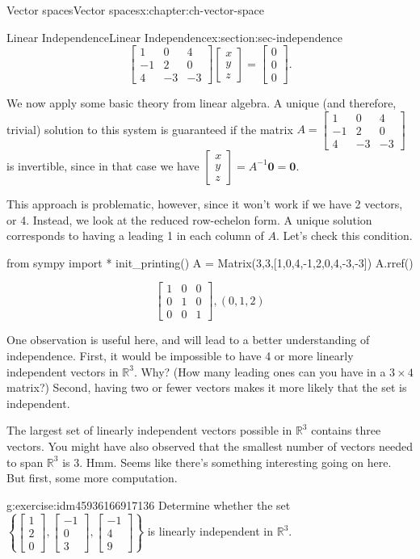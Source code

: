 \documentclass[oneside,10pt,]{book}
\numberwithin{equation}{section}
\newcommand{\bbm}{\begin{bmatrix}}
\newcommand{\ebm}{\end{bmatrix}}
\newcommand{\R}{\mathbb{R}}
\newcommand{\amp}{&}
\begin{document}
\begin{chapterptx}{Vector spaces}{}{Vector spaces}{}{}{x:chapter:ch-vector-space}
\begin{sectionptx}{Linear Independence}{}{Linear Independence}{}{}{x:section:sec-independence}
\begin{equation*}
\bbm 1\amp0\amp4\\-1\amp2\amp0\\4\amp-3\amp-3\ebm\bbm x\\y\\z\ebm = \bbm 0\\0\\0\ebm\text{.}
\end{equation*}
%
\par
We now apply some basic theory from linear algebra. A unique (and therefore, trivial) solution to this system is guaranteed if the matrix \(A = \bbm 1\amp0\amp4\\-1\amp2\amp0\\4\amp-3\amp-3\ebm\) is invertible, since in that case we have \(\bbm x\\y\\z\ebm = A^{-1}\mathbf{0} = \mathbf{0}\).%
\par
This approach is problematic, however, since it won't work if we have 2 vectors, or 4. Instead, we look at the reduced row-echelon form. A unique solution corresponds to having a leading 1 in each column of \(A\). Let's check this condition.%
\begin{sageinput}
from sympy import *
init_printing()
A = Matrix(3,3,[1,0,4,-1,2,0,4,-3,-3])
A.rref()
\end{sageinput}
\begin{sageoutput}
\[\bbm 1\amp 0\amp 0\\0\amp 1\amp 0\\0\amp 0\amp 1\ebm, (0,1,2)\]
\end{sageoutput}
One observation is useful here, and will lead to a better understanding of independence. First, it would be impossible to have 4 or more linearly independent vectors in \(\mathbb{R}^3\). Why? (How many leading ones can you have in a \(3\times 4\) matrix?) Second, having two or fewer vectors makes it more likely that the set is independent.%
\par
The largest set of linearly independent vectors possible in \(\mathbb{R}^3\) contains three vectors. You might have also observed that the smallest number of vectors needed to span \(\mathbb{R}^3\) is 3. Hmm. Seems like there's something interesting going on here. But first, some more computation.%
\begin{inlineexercise}{}{g:exercise:idm45936166917136}%
Determine whether the set \(\left\{\bbm 1\\2\\0\ebm, \bbm -1\\0\\3\ebm,\bbm -1\\4\\9\ebm\right\}\) is linearly independent in \(\R^3\).%

\end{inlineexercise}
\end{sectionptx}
\end{chapterptx}
\end{document}
